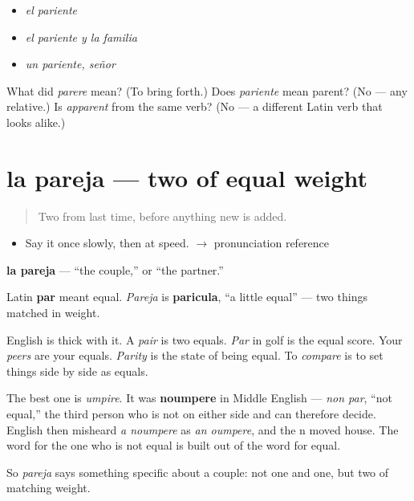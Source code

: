 \begin{itemize}
\raggedright
  \item \emph{el pariente}
  \item \emph{el pariente y la familia}
  \item \emph{un pariente, señor}
\end{itemize}

\begin{tcolorbox}[breakable,colback=teal!4,colframe=teal!35!black,title={Before you move on}]
What did \emph{parere} mean? (To bring forth.) Does \emph{pariente} mean parent? (No --- any relative.) Is \emph{apparent} from the same verb? (No --- a different Latin verb that looks alike.)
\end{tcolorbox}
\section[la pareja]{la pareja --- two of equal weight}

\label{lesson:ES-C309-pareja}



\begin{quote}
Two from last time, before anything new is added.
\end{quote}

\begin{sounds}
\begin{itemize}
\raggedright
  \item Say it once slowly, then at speed. $\to$ pronunciation reference
\end{itemize}
\end{sounds}

\begin{cousinweb}
\textbf{la pareja} --- \textquotedblleft{}the couple,\textquotedblright{} or \textquotedblleft{}the partner.\textquotedblright{}

Latin \textbf{par} meant equal. \emph{Pareja} is \textbf{paricula}, \textquotedblleft{}a little equal\textquotedblright{} --- two things matched in weight.

English is thick with it. A \emph{pair} is two equals. \emph{Par} in golf is the equal score. Your \emph{peers} are your equals. \emph{Parity} is the state of being equal. To \emph{compare} is to set things side by side as equals.

The best one is \emph{umpire}. It was \textbf{noumpere} in Middle English --- \emph{non par}, \textquotedblleft{}not equal,\textquotedblright{} the third person who is not on either side and can therefore decide. English then misheard \emph{a noumpere} as \emph{an oumpere}, and the n moved house. The word for the one who is not equal is built out of the word for equal.

So \emph{pareja} says something specific about a couple: not one and one, but two of matching weight.
\end{cousinweb}


